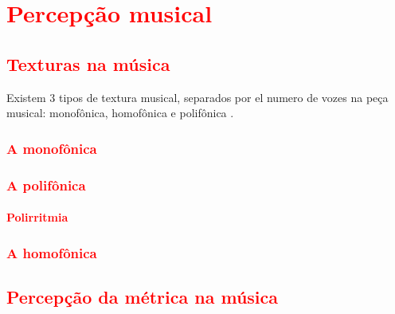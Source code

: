 
\chapter{\textcolor{red}{Percepção musical}}
\label{cap:percepcaomusical}

\section{\textcolor{red}{Texturas na música}}
Existem 3 tipos de textura musical, separados por el numero de vozes na peça musical: monofônica, homofônica e
polifônica \cite[pp. 29]{kerman2015listen} \cite{copland1974ouvir} \cite[pp. 322]{harnum2009basic}.

\subsection{\textcolor{red}{A monofônica}}
\cite[pp. 29]{kerman2015listen} \cite{copland1974ouvir} 
\cite[pp. 38]{schurmann1989m} \cite[pp. 57]{holland2013music}

\subsection{\textcolor{red}{A polifônica}}
\cite[pp. 29]{kerman2015listen} \cite{copland1974ouvir} 
\cite[pp. 64]{schurmann1989m} \cite[pp. 59]{holland2013music}

\subsubsection{\textcolor{red}{Polirritmia}}
\cite[pp. 93]{alves2004teoria}
\cite[pp. 35]{holland2013music}

\subsection{\textcolor{red}{A homofônica}}
\cite[pp. 29]{kerman2015listen} \cite{copland1974ouvir} 
\cite[pp. 121]{schurmann1989m} \cite[pp. 58]{holland2013music}



\section{\textcolor{red}{Percepção da métrica na música}}

